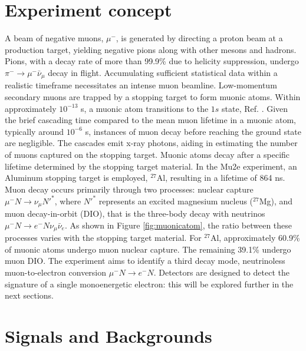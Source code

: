 \section{Experiment concept}
A beam of negative muons, $\mu ^-$, is generated by directing a proton beam at a production target, yielding negative pions along with other mesons and hadrons. Pions, with a decay rate of more than 99.9\% due to helicity suppression, undergo $\pi ^- \rightarrow \mu ^- \bar{\nu}_\mu$ decay in flight. Accumulating sufficient statistical data within a realistic timeframe necessitates an intense muon beamline. Low-momentum secondary muons are trapped by a stopping target to form muonic atoms. Within approximately $10^{-13}$ s, a muonic atom transitions to the $1s$ state, Ref. \cite{MEASDAY2001243}. Given the brief cascading time compared to the mean muon lifetime in a muonic atom, typically around $10^{-6}$ s, instances of muon decay before reaching the ground state are negligible. The cascades emit x-ray photons, aiding in estimating the number of muons captured on the stopping target. Muonic atoms decay after a specific lifetime determined by the stopping target material. In the Mu2e experiment, an Aluminum stopping target is employed, $^{27}$Al, resulting in a lifetime of 864 ns. Muon decay occurs primarily through two processes: nuclear capture $\mu^- N \rightarrow \nu_\mu N'^* $, where $N'^*$ represents an excited magnesium nucleus ($^{27}$Mg), and muon decay-in-orbit (DIO), that is the three-body decay with neutrinos $\mu ^- N \rightarrow e^- N \nu_\mu \bar{\nu}_e$. As shown in Figure \ref{fig:muonicatom}, the ratio between these processes varies with the stopping target material. For $^{27}$Al, approximately 60.9\% of muonic atoms undergo muon nuclear capture. The remaining 39.1\% undergo muon DIO. The experiment aims to identify a third decay mode, neutrinoless muon-to-electron conversion $\mu^- N \rightarrow e^- N $. Detectors are designed to detect the signature of a single monoenergetic electron: this will be explored further in the next sections.

\section{Signals and Backgrounds}\label{sigandbkg}
